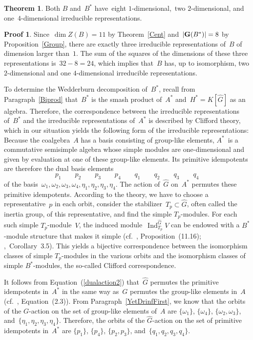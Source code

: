 \documentclass{article}
\numberwithin{equation}{section}
\theoremstyle{definition}
\newtheorem*{pf}{Proof}
\newtheorem*{thm}{Theorem}
\theoremstyle{break}
\newcommand{\dm}{\operatorname{dim}}
\newcommand{\Ind}{\operatorname{Ind}}
\newcommand{\1}{{(1)}}
\newcommand{\2}{{(2)}}
\newcommand{\3}{{(3)}}
\begin{document}
\begin{thm} \label{RepsBB*}
Both $B$ and~$B^*$ have~eight $1$-dimensional,~two $2$-dimensional, and one~$4$-dimensional irreducible representations.
\end{thm}
\begin{pf}
Since~$\dm Z(B)=11$ by Theorem~\ref{Cent} and~$\left|{\bf G}(B^*)\right|=8$ by Proposition~\ref{Group}, there are exactly three irreducible representations of~$B$ of dimension larger than~$1$. The sum of the squares of the dimensions of these three representations is~$32-8=24$, which implies that~$B$ has, up to isomorphism, two $2$-dimensional and one $4$-dimensional irreducible representations.

To determine the Wedderburn decomposition of~$B^*$, recall from Paragraph~\ref{Biprod} that~$B^*$ is the smash product of~$A^*$ and~$H^* = K[\hat G]$ as an algebra. Therefore, the correspondence between the irreducible representations of~$B^*$ and the irreducible representations of~$A^*$ is described by Clifford theory, which in our situation yields the following form of the irreducible representations: Because the coalgebra~$A$ has a basis consisting of group-like elements, $A^*$~is a commutative semisimple algebra whose simple modules are one-dimensional and given by evaluation at one of these group-like elements. Its primitive idempotents are therefore the dual basis elements
\[p_1 \qquad p_2 \qquad p_3 \qquad p_4 \qquad q_1 \qquad q_2 \qquad q_3 \qquad q_4\]
of the basis~$\omega_1, \omega_2, \omega_3, \omega_4, \eta_1, \eta_2, \eta_3, \eta_4$. The action of~$\hat G$ on~$A^*$ permutes these primitive idempotents. According to the theory, we have to choose a representative~$p$ in each orbit, consider the stabilizer~$T_p \subset \hat G$, often called the inertia group, of this representative, and find the simple \mbox{$T_p$-modules}. For each such simple \mbox{$T_p$-module~$V$}, the induced module~$\Ind^{\hat G}_{T_p} V$ can be endowed with a \mbox{$B^*$-module} structure that makes it simple (cf.~\cite{CR2}, Proposition~(11.16); \cite{KMM},~Corollary~3.5). This yields a bijective correspondence between the isomorphism classes of simple \mbox{$T_p$-modules} in the various orbits and the isomorphism classes of simple \mbox{$B^*$-modules}, the so-called Clifford correspondence.

It follows from Equation~(\ref{dualaction2}) that~$\hat G$ permutes the primitive idempotents in~$A^*$ in the same way as~$G$ permutes the group-like elements in~$A$ (cf.~\cite{KMM}, Equation~(2.3)). From Paragraph~\ref{YetDrinfFirst}, we know that the orbits of the \mbox{$G$-action} on the set of group-like elements of~$A$ are $\{\omega_1\}$, $\{\omega_4\}$, $\{\omega_2, \omega_3\}$, and~$\{\eta_1, \eta_2, \eta_3, \eta_4\}$. Therefore, the orbits of the \mbox{$\hat G$-action} on the set of primitive idempotents in~$A^*$ are $\{p_1\}$, $\{p_4\}$, $\{p_2, p_3\}$, and~$\{q_1, q_2, q_3, q_4\}$.


\end{pf}
\end{document}
